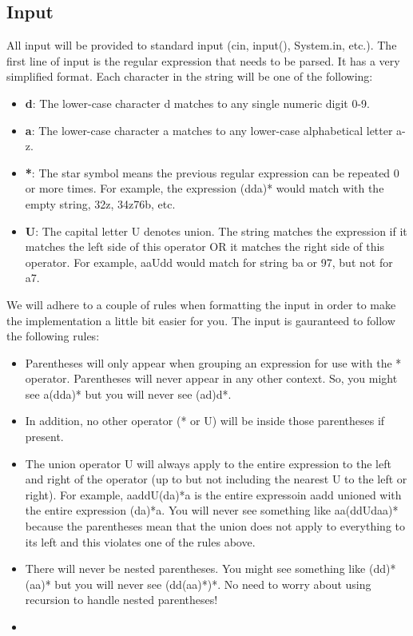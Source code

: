 \documentclass[11pt]{article}
\begin{document}
\subsection*{Input}

All input will be provided to standard input (cin, input(), System.in, etc.). The first line of input is the regular expression that needs to be parsed. It has a very simplified format. Each character in the string will be one of the following:

\begin{itemize}
	\item \textbf{d}: The lower-case character d matches to any single numeric digit 0-9.
	\item \textbf{a}: The lower-case character a matches to any lower-case alphabetical letter a-z.
	\item \textbf{*}: The star symbol means the previous regular expression can be repeated 0 or more times. For example, the expression (dda)* would match with the empty string, 32z, 34z76b, etc.
	\item \textbf{U}: The capital letter U denotes union. The string matches the expression if it matches the left side of this operator OR it matches the right side of this operator. For example, aaUdd would match for string ba or 97, but not for a7.
\end{itemize}

We will adhere to a couple of rules when formatting the input in order to make the implementation a little bit easier for you. The input is gauranteed to follow the following rules:

 \begin{itemize}
	\item Parentheses will only appear when grouping an expression for use with the * operator. Parentheses will never appear in any other context. So, you might see a(dda)* but you will never see (ad)d*.
	\item In addition, no other operator (* or U) will be inside those parentheses if present.
	\item The union operator U will always apply to the entire expression to the left and right of the operator (up to but not including the nearest U to the left or right). For example, aaddU(da)*a is the entire expressoin aadd unioned with the entire expression (da)*a. You will never see something like aa(ddUdaa)* because the parentheses mean that the union does not apply to everything to its left and this violates one of the rules above.
	\item There will never be nested parentheses. You might see something like (dd)*(aa)* but you will never see (dd(aa)*)*. No need to worry about using recursion to handle nested parentheses!
	\item  
\end{itemize}
\end{document}
